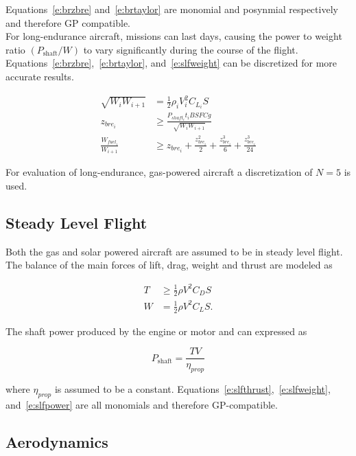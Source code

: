 \documentclass[]{aiaa-tc}%
\begin{document}
    Equations~\ref{e:brzbre} and~\ref{e:brtaylor} are monomial and posynmial respectively and therefore GP compatible. \\
    
    For long-endurance aircraft, missions can last days, causing the power to weight ratio $(P_{\text{shaft}}/W)$ to vary significantly during the course of the flight.  Equations~\ref{e:brzbre},~\ref{e:brtaylor}, and~\ref{e:slfweight} can be discretized for more accurate results.

\begin{align}
    \label{e:slfweightd}
    \sqrt{W_i W_{i+1}} &= \frac{1}{2} \rho_i V_i^2 C_{L_i} S \\
    \label{e:brzbred}
    z_{bre_i} &\geq \frac{P_{shaft_i}t_i BSFC g}{\sqrt{W_i W_{i+1}}}\\
    \label{e:brtaylord}
    \frac{W_{fuel_i}}{W_{i+1}} &\geq z_{bre_i} + \frac{z_{bre_i}^2}{2} + \frac{z_{bre_i}^3}{6} + \frac{z_{bre_i}^3}{24} 
    \end{align}

    For evaluation of long-endurance, gas-powered aircraft a discretization of $N=5$ is used. 

\subsection{Steady Level Flight}

Both the gas and solar powered aircraft are assumed to be in steady level flight.  The balance of the main forces of lift, drag, weight and thrust are modeled as

\begin{align}
    \label{e:slfthrust}
    T &\geq \frac{1}{2} \rho V^2 C_D S\\
    \label{e:slfweight}
    W &= \frac{1}{2} \rho V^2 C_L S . 
\end{align}

The shaft power produced by the engine or motor and can expressed as  

\begin{equation}
    \label{e:slfpower}
    P_{\text{shaft}} = \frac{TV}{\eta_{prop}}
    \end{equation}

    where $\eta_{prop}$ is assumed to be a constant. Equations~\ref{e:slfthrust},~\ref{e:slfweight}, and~\ref{e:slfpower} are all monomials and therefore GP-compatible.

\subsection{Aerodynamics}
\end{document}
